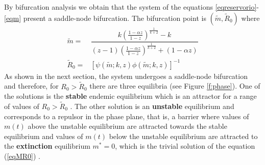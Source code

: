 \documentclass[12pt,a4paper]{article}
\theoremstyle{plain}%
\theoremstyle{definition}
\theoremstyle{remark}
\begin{document}
	By bifurcation analysis we obtain that the system of the  equations 
	\eqref{eqreservorio}-\eqref{eqm}
	present a saddle-node bifurcation.
	The bifurcation point is $(\tilde m,\tilde R_0)$ where 
	\begin{equation}\label{meq}
	\begin{split}
	\tilde m=&\dfrac{k\left( \frac{1-\alpha z}{1-z}\right)^{\frac{1}{k+2}} - k}{(z-1)\left( \frac{1-\alpha z}{1-z}\right)^{\frac{1}{k+2}} + (1-\alpha z)}\\
	\tilde R_0=&\left[ \psi(\tilde m;k,z)\phi(\tilde m;k,z)\right]^{-1}
	\end{split}	
	\end{equation}
As shown in the next section, the system undergoes a saddle-node bifurcation and therefore, for  $R_0> \tilde R_0 $ there are three equilibria
 (see Figure \ref{f:phase}). 
	One of the solutions is the \textbf{stable}  endemic equilibrium %
	which is an attractor for a range of values of $R_0> \tilde R_0 $ .
	The other solution is an \textbf{unstable} equilibrium and corresponds to a repulsor in the phase plane, that is, a barrier where values of $m(t)$ above the unstable equilibrium are attracted towards the stable equilibrium and values of $m (t)$ below the unstable equilibrium are attracted to the \textbf{extinction} equilibrium $m^*= 0$, which is the trivial solution of the equation (\ref{eqMR0}) .
\end{document}
